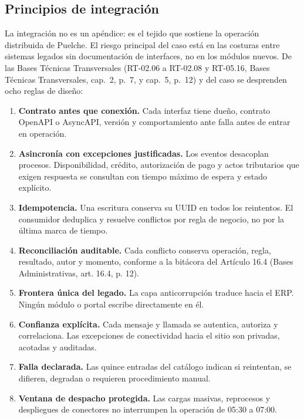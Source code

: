 \subsection{Principios de integración}
\label{subsec:principios-integracion}

La integración no es un apéndice: es el tejido que sostiene la operación distribuida de Puelche. El riesgo principal del caso está en las costuras entre sistemas legados sin documentación de interfaces, no en los módulos nuevos. De las Bases Técnicas Transversales (RT-02.06 a RT-02.08 y RT-05.16, Bases Técnicas Transversales, cap.~2, p.~7, y cap.~5, p.~12) y del caso se desprenden ocho reglas de diseño:

\begin{enumerate}
  \item \textbf{Contrato antes que conexión.} Cada interfaz tiene dueño, contrato OpenAPI o AsyncAPI, versión y comportamiento ante falla antes de entrar en operación.
  \item \textbf{Asincronía con excepciones justificadas.} Los eventos desacoplan procesos. Disponibilidad, crédito, autorización de pago y actos tributarios que exigen respuesta se consultan con tiempo máximo de espera y estado explícito.
  \item \textbf{Idempotencia.} Una escritura conserva su UUID en todos los reintentos. El consumidor deduplica y resuelve conflictos por regla de negocio, no por la última marca de tiempo.
  \item \textbf{Reconciliación auditable.} Cada conflicto conserva operación, regla, resultado, autor y momento, conforme a la bitácora del Artículo 16.4 (Bases Administrativas, art. 16.4, p. 12).
  \item \textbf{Frontera única del legado.} La capa anticorrupción traduce hacia el ERP. Ningún módulo o portal escribe directamente en él.
  \item \textbf{Confianza explícita.} Cada mensaje y llamada se autentica, autoriza y correlaciona. Las excepciones de conectividad hacia el sitio son privadas, acotadas y auditadas.
  \item \textbf{Falla declarada.} Las quince entradas del catálogo indican si reintentan, se difieren, degradan o requieren procedimiento manual.
  \item \textbf{Ventana de despacho protegida.} Las cargas masivas, reprocesos y despliegues de conectores no interrumpen la operación de 05:30 a 07:00.
\end{enumerate}

